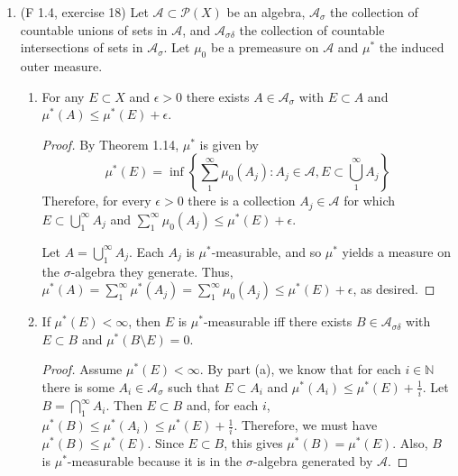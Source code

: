 \documentclass[10pt]{article}
\newcommand{\N}{\mathbb{N}}
\renewcommand{\P}{\mathcal{P}}
\begin{document}
\begin{enumerate}
\begin{proof}
Now, $0 \leq \mu^*(E \cap \bigcup_{n+1}^\infty A_i) \leq \sum_{n+1}^\infty \mu^*(E \cap A_i)$, and $\lim\limits_{n \rightarrow \infty} \sum_{n+1}^\infty \mu^*(E \cap A_i) = 0$, so we must have $\lim\limits_{n \rightarrow \infty} \mu^*(E \cap \bigcup_{n+1}^\infty A_i) = 0$.  Also, $\sum_1^{n+1} \mu^*(E \cap A_i)$ is an increasing sequence, hence its limit must exist.  Therefore,
$$
\mu^*(E \cap \bigcup_1^\infty A_i) = \lim_{n \rightarrow \infty} \mu^*(E \cap \bigcup_1^\infty A_i) = \lim_{n \rightarrow \infty} \left[ \sum_1^{n+1} \mu^*(E \cap A_i) + \mu^*(E \cap \bigcup_{n+1}^\infty A_i) \right] = \sum_1^\infty \mu^*(E \cap A_i).
$$
\end{proof}

\newcommand{\A}{\mathcal{A}}

\item (F 1.4, exercise 18) Let $\A \subset \P(X)$ be an algebra, $\A_\sigma$ the collection of countable unions of sets in $\A$, and $\A_{\sigma \delta}$ the collection of countable intersections of sets in $\A_\sigma$.  Let $\mu_0$ be a premeasure on $\A$ and $\mu^*$ the induced outer measure.
\begin{enumerate}
\item For any $E \subset X$ and $\epsilon > 0$ there exists $A \in \A_\sigma$ with $E \subset A$ and $\mu^*(A) \leq \mu^*(E) + \epsilon$.

\begin{proof}
By Theorem 1.14, $\mu^*$ is given by
$$
\mu^*(E) = \inf \left\{ \sum_1^\infty \mu_0(A_j) : A_j \in \A, E \subset \bigcup_1^\infty A_j \right\}
$$
Therefore, for every $\epsilon > 0$ there is a collection $A_j \in \A$ for which $E \subset \bigcup_1^\infty A_j$ and $\sum_1^\infty \mu_0(A_j) \leq \mu^*(E) + \epsilon$.

Let $A = \bigcup_1^\infty A_j$.  Each $A_j$ is $\mu^*$-measurable, and so $\mu^*$ yields a measure on the $\sigma$-algebra they generate.  Thus, $\mu^*(A) = \sum_1^\infty \mu^*(A_j) = \sum_1^\infty \mu_0(A_j) \leq \mu^*(E) + \epsilon$, as desired.
\end{proof}

\item If $\mu^*(E) < \infty$, then $E$ is $\mu^*$-measurable iff there exists $B \in \A_{\sigma \delta}$ with $E \subset B$ and $\mu^*(B \setminus E) = 0$.

\begin{proof}
Assume $\mu^*(E) < \infty$.  By part (a), we know that for each $i \in \N$ there is some $A_i \in \A_{\sigma}$ such that $E \subset A_i$ and $\mu^*(A_i) \leq \mu^*(E) + \frac1i$.  Let $B = \bigcap_1^\infty A_i$.  Then $E \subset B$ and, for each $i$, $\mu^*(B) \leq \mu^*(A_i) \leq \mu^*(E) + \frac{1}{i}$.  Therefore, we must have $\mu^*(B) \leq \mu^*(E)$.  Since $E \subset B$, this gives $\mu^*(B) = \mu^*(E)$.  Also, $B$ is $\mu^*$-measurable because it is in the $\sigma$-algebra generated by $\A$.


\end{proof}
\end{enumerate}
\end{enumerate}
\end{document}
